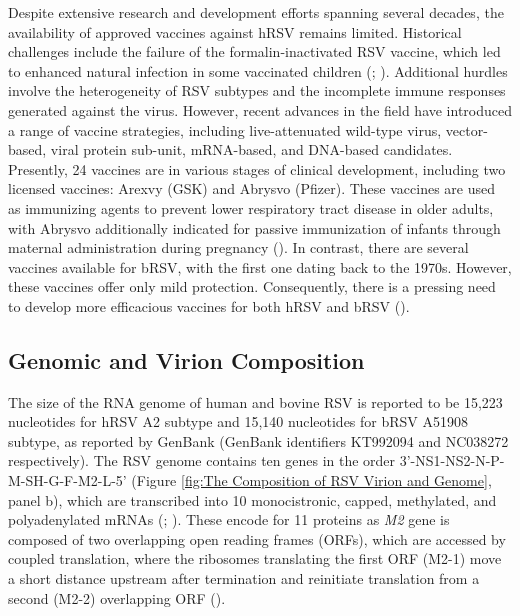 Despite extensive research and development efforts spanning several decades, the availability of approved vaccines against hRSV remains limited. Historical challenges include the failure of the formalin-inactivated RSV vaccine, which led to enhanced natural infection in some vaccinated children (\cite{Fulginiti1969RespiratoryVaccine.}; \cite{Kim1969RespiratoryVaccine.}). Additional hurdles involve the heterogeneity of RSV subtypes and the incomplete immune responses generated against the virus. However, recent advances in the field have introduced a range of vaccine strategies, including live-attenuated wild-type virus, vector-based, viral protein sub-unit, mRNA-based, and DNA-based candidates. Presently, 24 vaccines are in various stages of clinical development, including two licensed vaccines: Arexvy (GSK) and Abrysvo (Pfizer). These vaccines are used as immunizing agents to prevent lower respiratory tract disease in older adults, with Abrysvo additionally indicated for passive immunization of infants through maternal administration during pregnancy (\cite{Topalidou2023RespiratoryVaccines}). In contrast, there are several vaccines available for bRSV, with the first one dating back to the 1970s. However, these vaccines offer only mild protection. Consequently, there is a pressing need to develop more efficacious vaccines for both hRSV and bRSV (\cite{Ellis2017HowCattle}).

\subsection{Genomic and Virion Composition} \label{subsec:Genomic and Virion Composition}
The size of the RNA genome of human and bovine RSV is reported to be 15,223 nucleotides for hRSV A2 subtype and 15,140 nucleotides for bRSV A51908 subtype, as reported by GenBank (GenBank identifiers KT992094 and NC038272 respectively). The RSV genome contains ten genes in the order 3'-NS1-NS2-N-P-M-SH-G-F-M2-L-5' (Figure \ref{fig:The Composition of RSV Virion and Genome}, panel b), which are transcribed into 10 monocistronic, capped, methylated, and polyadenylated mRNAs (\cite{Collins2013RespiratoryDisease}; \cite{Bohmwald2016HumanPathology}). These encode for 11 proteins as \textit{M2} gene is composed of two overlapping open reading frames (ORFs), which are accessed by coupled translation, where the ribosomes translating the first ORF (M2-1) move a short distance upstream after termination and reinitiate translation from a second (M2-2) overlapping ORF (\cite{Gould2007Pneumovirinae}).

